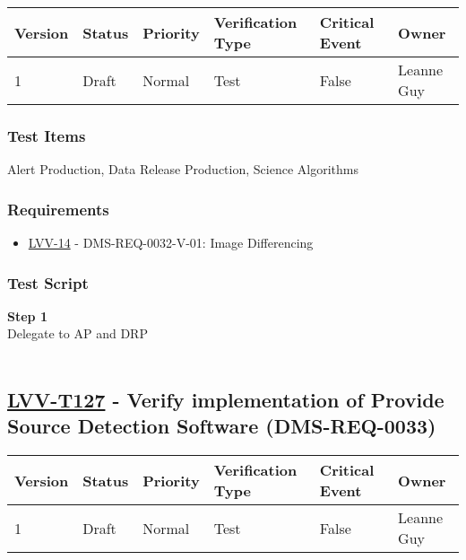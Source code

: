 \begin{longtable}[]{@{}llllll@{}}
\toprule
Version & Status & Priority & Verification Type & Critical Event &
Owner\tabularnewline
\midrule
\endhead
1 & Draft & Normal & Test & False & Leanne Guy\tabularnewline
\bottomrule
\end{longtable}

\hypertarget{test-items-102}{%
\subsubsection{Test Items}\label{test-items-102}}

Alert Production, Data Release Production, Science Algorithms~

\hypertarget{requirements-103}{%
\subsubsection{Requirements}\label{requirements-103}}

\begin{itemize}
\tightlist
\item
  \href{https://jira.lsstcorp.org/browse/LVV-14}{LVV-14} -
  DMS-REQ-0032-V-01: Image Differencing
\end{itemize}

\hypertarget{test-script-103}{%
\subsubsection{Test Script}\label{test-script-103}}

\textbf{Step 1}\\
Delegate to AP and DRP\\
~\\

\hypertarget{lvv-t127---verify-implementation-of-provide-source-detection-software-dms-req-0033}{%
\subsection{\texorpdfstring{\href{https://jira.lsstcorp.org/secure/Tests.jspa\#/testCase/LVV-T127}{LVV-T127}
- Verify implementation of Provide Source Detection Software
(DMS-REQ-0033)}{LVV-T127 - Verify implementation of Provide Source Detection Software (DMS-REQ-0033)}}\label{lvv-t127---verify-implementation-of-provide-source-detection-software-dms-req-0033}}

\begin{longtable}[]{@{}llllll@{}}
\toprule
Version & Status & Priority & Verification Type & Critical Event &
Owner\tabularnewline
\midrule
\endhead
1 & Draft & Normal & Test & False & Leanne Guy\tabularnewline
\bottomrule
\end{longtable}


